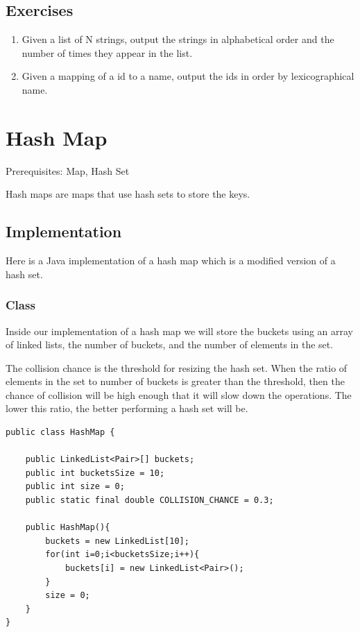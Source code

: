 \documentclass[11pt,oneside]{book}
\begin{document}
\subsection{Exercises}

\begin{enumerate}
\item Given a list of N strings, output the strings in alphabetical order and the number of times they appear in the list.
\item Given a mapping of a id to a name, output the ids in order by lexicographical name.
\end{enumerate}

        \section{ Hash Map }
        

Prerequisites: Map, Hash Set



Hash maps are maps that use hash sets to store the keys.

\subsection{Implementation}

Here is a Java implementation of a hash map which is a modified version of a hash set.

\subsubsection{Class}

Inside our implementation of a hash map we will store the buckets using an array of linked lists, the number of buckets, and the number of elements in the set.

The collision chance is the threshold for resizing the hash set. When the ratio of elements in the set to number of buckets is greater than the threshold, then the chance of collision will be high enough that it will slow down the operations. The lower this ratio, the better performing a hash set will be.

\begin{lstlisting}
public class HashMap {

    public LinkedList<Pair>[] buckets;
    public int bucketsSize = 10;
    public int size = 0;
    public static final double COLLISION_CHANCE = 0.3;
    
    public HashMap(){
        buckets = new LinkedList[10];
        for(int i=0;i<bucketsSize;i++){
            buckets[i] = new LinkedList<Pair>();
        }
        size = 0;
    }
}
\end{lstlisting}
\end{document}
